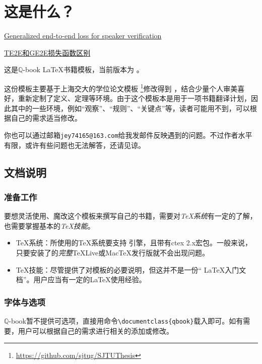 \chapter{这是什么？}

\href{https://blog.csdn.net/qq_34218078/article/details/104454388}{Generalized end-to-end loss for speaker verification}

\href{https://blog.csdn.net/qq_26369907/article/details/90760456}{TE2E和GE2E损失函数区别}

这是$\mathbb{ Q}$-book \LaTeX 书籍模板，当前版本为 \version 。

这份模板主要基于上海交大的学位论文模板
\footnote{\url{https://github.com/sjtug/SJTUThesis}}修改得到
，结合少量个人审美喜好，重新定制了定义、定理等环境。由于这个模板本是用于一项书籍翻译计划，因此其中的一些环境，例如“观察”、“规则”、“关键点”等，读者可能用不到，可以根据自己的需求适当修改。

你也可以通过邮箱\texttt{jey74165@163.com}给我发邮件反映遇到的问题。不过作者水平有限，或许有些问题也无法解答，还请见谅。

\section{文档说明}

\subsection{准备工作}

要想灵活使用、魔改这个模板来撰写自己的书籍，需要对\emph{TeX系统}有一定的了解，也需要掌握基本的\emph{TeX技能}。

\begin{itemize}[noitemsep,topsep=0pt,parsep=0pt,partopsep=0pt]
	\item {\TeX}系统：所使用的{\TeX}系统要支持 \XeTeX 引擎，且带有ctex 2.x宏包。一般来说，只要安装了的\emph{完整}TeXLive或MacTeX发行版就不会出现问题。
	\item TeX技能：尽管提供了对模板的必要说明，但这并不是一份“ \LaTeX 入门文档”。用户应当有一定的\LaTeX 使用经验。
\end{itemize}

\subsection{字体与选项}

$\mathbb{ Q }$-book暂不提供可选项，直接用命令\verb|\documentclass{qbook}|载入即可。如有需要，用户可以根据自己的需求进行相关的添加或修改。

